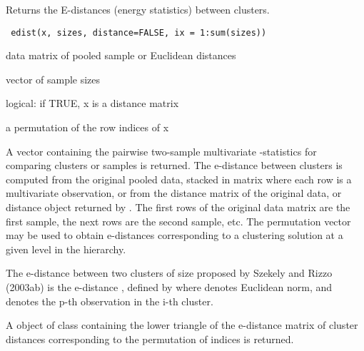 \begin{Description}\relax
Returns the E-distances (energy statistics) between clusters.
\end{Description}
\begin{Usage}
\begin{verbatim}
 edist(x, sizes, distance=FALSE, ix = 1:sum(sizes))
\end{verbatim}
\end{Usage}
\begin{Arguments}
\begin{ldescription}
\item[\code{x}] data matrix of pooled sample or Euclidean distances
\item[\code{sizes}] vector of sample sizes
\item[\code{distance}] logical: if TRUE, x is a distance matrix
\item[\code{ix}] a permutation of the row indices of x 
\end{ldescription}
\end{Arguments}
\begin{Details}\relax
A vector containing the pairwise two-sample multivariate 
-statistics for comparing clusters or samples is returned. 
The e-distance between clusters is computed from the original pooled data, 
stacked in matrix  where each row is a multivariate observation, or 
from the distance matrix  of the original data, or distance object 
returned by . The first  rows of the original data 
matrix are the first sample, the next  rows are the second 
sample, etc. The permutation vector  may be used to obtain
e-distances corresponding to a clustering solution at a given level in
the hierarchy.

The e-distance between two clusters 
of size  
proposed by Szekely and Rizzo (2003ab)
is the e-distance , defined by
where
\eqn{\|\cdot\|}{|| ||} denotes Euclidean norm, and  denotes the p-th observation in the i-th cluster.\end{Details}
\begin{Value}
A object of class  containing the lower triangle of the
e-distance matrix of cluster distances corresponding to the permutation 
of indices  is returned.\end{Value}
